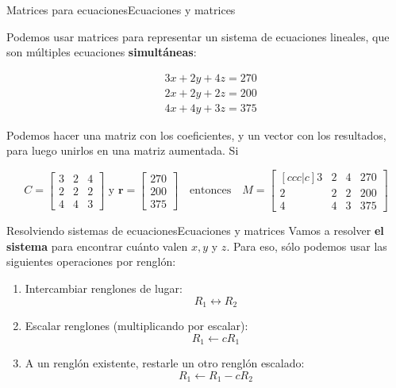 \documentclass[spanish, c]{beamer}
\begin{document}
\begin{frame}{Matrices para ecuaciones}{Ecuaciones y matrices}

    Podemos usar matrices para representar un \alert{sistema de ecuaciones lineales}, que son múltiples ecuaciones \textbf{simultáneas}: \pause

    \begin{align*}
        & 3x + 2y + 4z = 270 \\
        & 2x + 2y + 2z = 200 \\
        & 4x + 4y + 3z = 375
    \end{align*} \pause

    Podemos hacer una matriz con los coeficientes, y un vector con los resultados, para luego unirlos en una \alert{matriz aumentada}. Si 

    \[
        C = \begin{bmatrix*}
            3 & 2 & 4 \\
            2 & 2 & 2 \\
            4 & 4 & 3
        \end{bmatrix*} \text{ y }
        \mathbf{r} =
        \begin{bmatrix*}
            270 \\ 200 \\ 375
        \end{bmatrix*} \quad \text{entonces} \quad
        M = \begin{bmatrix}[ccc|c]
            3 & 2 & 4 & 270 \\
            2 & 2 & 2 & 200 \\
            4 & 4 & 3 & 375
        \end{bmatrix}    
    \]   

\end{frame}

\begin{frame}{Resolviendo sistemas de ecuaciones}{Ecuaciones y matrices}
    Vamos a \alert{resolver} \textbf{el sistema} para encontrar cuánto valen $x, y$ y $z$.
    Para eso, sólo podemos usar las siguientes \alert{operaciones por renglón}: \pause

    \bigskip

    \begin{enumerate}[<+->]
        \item Intercambiar renglones de lugar: $$R_1 \leftrightarrow R_2$$
        \item Escalar renglones (multiplicando por escalar): $$R_1 \leftarrow cR_1$$
        \item A un renglón existente, restarle un otro renglón escalado: $$R_1 \leftarrow R_1 - cR_2$$
    \end{enumerate}
\end{frame}
\end{document}
